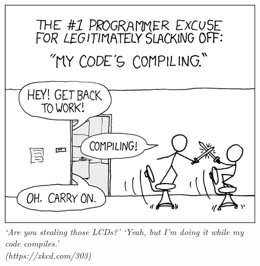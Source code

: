 \begin{figure}[h!]
\centering
\includegraphics[scale=.7]{img/xkcd/compiling.png}
\caption*{{\small
    \foreignlanguage{english}{
      \textit{\enquote*{Are you stealing those LCDs?} \enquote*{Yeah, but I'm doing it while my code compiles.}\\\hspace*{1mm}\hfill(https://xkcd.com/303)}
    }
  }
}
\end{figure}
